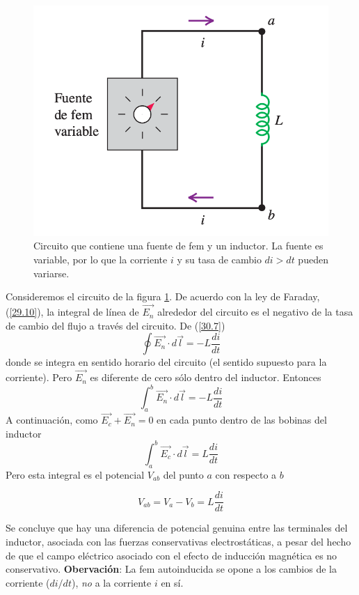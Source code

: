 \begin{figure}[h]
\centering
\includegraphics[scale=0.4]{fig/circuito}
\caption{Circuito que contiene una fuente de fem y un inductor. La fuente es variable, por lo que la corriente $i$ y su tasa de cambio $di>dt$ pueden variarse.}
\label{fig30.5.circuito}
\end{figure}

Consideremos el circuito de la figura \ref{fig30.5.circuito}. De acuerdo con la ley de Faraday, (\ref{29.10}), la integral de línea de $\vec{E_n}$ alrededor del circuito es el negativo de la tasa de cambio del flujo a través del circuito. De (\ref{30.7}) $$\oint\vec{E_n}\cdot d\vec{l}=-L\frac{di}{dt}$$ donde se integra en sentido horario del circuito (el sentido supuesto para la corriente). Pero $\vec{E_n}$ es diferente de cero sólo dentro del inductor. Entonces $$\int_a^b\vec{E_n}\cdot d\vec{l}=-L\frac{di}{dt}$$ A continuación, como $\vec{E_c}+\vec{E_n}=0$ en cada punto dentro de las bobinas del inductor $$\int_a^b\vec{E_c}\cdot d\vec{l}=L\frac{di}{dt}$$ Pero esta integral es el potencial $V_{ab}$ del punto $a$ con respecto a $b$

\begin{equation}\label{30.8}
V_{ab}=V_a-V_b=L\frac{di}{dt}
\end{equation}

Se concluye que hay una diferencia de potencial genuina entre las terminales del inductor, asociada con las fuerzas conservativas electrostáticas, a pesar del hecho de que el campo eléctrico asociado con el efecto de inducción magnética es no conservativo.
\textbf{Obervación}: La fem autoinducida se opone a los cambios de la corriente ($di/dt$), \textit{no} a la corriente $i$ en sí.

